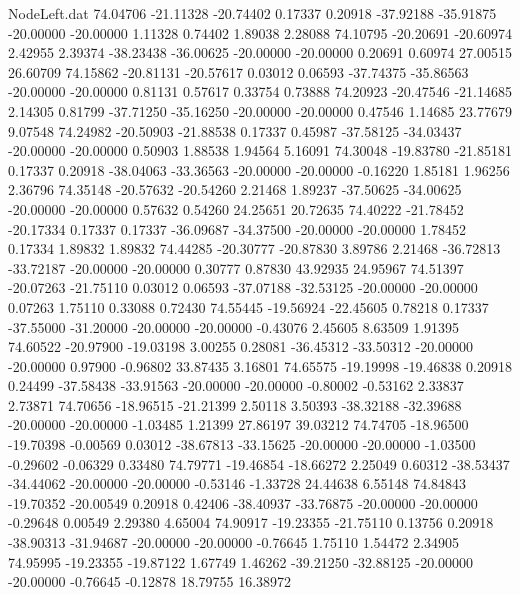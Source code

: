 \begin{filecontents}{NodeLeft.dat}
  74.04706  -21.11328  -20.74402     0.17337    0.20918  -37.92188  -35.91875  -20.00000  -20.00000    1.11328    0.74402    1.89038    2.28088
  74.10795  -20.20691  -20.60974     2.42955    2.39374  -38.23438  -36.00625  -20.00000  -20.00000    0.20691    0.60974   27.00515   26.60709
  74.15862  -20.81131  -20.57617     0.03012    0.06593  -37.74375  -35.86563  -20.00000  -20.00000    0.81131    0.57617    0.33754    0.73888
  74.20923  -20.47546  -21.14685     2.14305    0.81799  -37.71250  -35.16250  -20.00000  -20.00000    0.47546    1.14685   23.77679    9.07548
  74.24982  -20.50903  -21.88538     0.17337    0.45987  -37.58125  -34.03437  -20.00000  -20.00000    0.50903    1.88538    1.94564    5.16091
  74.30048  -19.83780  -21.85181     0.17337    0.20918  -38.04063  -33.36563  -20.00000  -20.00000   -0.16220    1.85181    1.96256    2.36796
  74.35148  -20.57632  -20.54260     2.21468    1.89237  -37.50625  -34.00625  -20.00000  -20.00000    0.57632    0.54260   24.25651   20.72635
  74.40222  -21.78452  -20.17334     0.17337    0.17337  -36.09687  -34.37500  -20.00000  -20.00000    1.78452    0.17334    1.89832    1.89832
  74.44285  -20.30777  -20.87830     3.89786    2.21468  -36.72813  -33.72187  -20.00000  -20.00000    0.30777    0.87830   43.92935   24.95967
  74.51397  -20.07263  -21.75110     0.03012    0.06593  -37.07188  -32.53125  -20.00000  -20.00000    0.07263    1.75110    0.33088    0.72430
  74.55445  -19.56924  -22.45605     0.78218    0.17337  -37.55000  -31.20000  -20.00000  -20.00000   -0.43076    2.45605    8.63509    1.91395
  74.60522  -20.97900  -19.03198     3.00255    0.28081  -36.45312  -33.50312  -20.00000  -20.00000    0.97900   -0.96802   33.87435    3.16801
  74.65575  -19.19998  -19.46838     0.20918    0.24499  -37.58438  -33.91563  -20.00000  -20.00000   -0.80002   -0.53162    2.33837    2.73871
  74.70656  -18.96515  -21.21399     2.50118    3.50393  -38.32188  -32.39688  -20.00000  -20.00000   -1.03485    1.21399   27.86197   39.03212
  74.74705  -18.96500  -19.70398    -0.00569    0.03012  -38.67813  -33.15625  -20.00000  -20.00000   -1.03500   -0.29602   -0.06329    0.33480
  74.79771  -19.46854  -18.66272     2.25049    0.60312  -38.53437  -34.44062  -20.00000  -20.00000   -0.53146   -1.33728   24.44638    6.55148
  74.84843  -19.70352  -20.00549     0.20918    0.42406  -38.40937  -33.76875  -20.00000  -20.00000   -0.29648    0.00549    2.29380    4.65004
  74.90917  -19.23355  -21.75110     0.13756    0.20918  -38.90313  -31.94687  -20.00000  -20.00000   -0.76645    1.75110    1.54472    2.34905
  74.95995  -19.23355  -19.87122     1.67749    1.46262  -39.21250  -32.88125  -20.00000  -20.00000   -0.76645   -0.12878   18.79755   16.38972

\end{filecontents}
